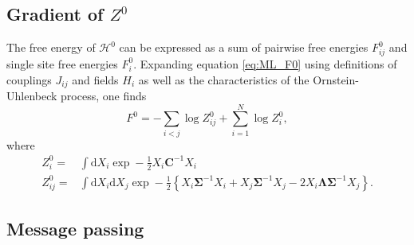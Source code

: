 \documentclass[10pt]{article}
\newcommand{\ddroit}{\textrm{d}}
\newcommand{\Lam}{\bm{\Lambda}}
\newcommand{\Sig}{\bm{\Sigma}}
\begin{document}
\subsection{Gradient of $Z^0$} %
\label{sub:gradient_of_z_0_}
The free energy of $\mathcal{H}^0$ can be expressed as a sum of pairwise free energies $F_{ij}^0$ and single site free energies $F_i^0$. Expanding equation \ref{eq:ML_F0} using definitions of couplings $J_{ij}$ and fields $H_i$ as well as the characteristics of the Ornstein-Uhlenbeck process, one finds 
\begin{equation}
  F^0 = -\sum_{i<j}\log{Z_{ij}^0} + \sum_{i=1}^N\log Z_i^0,
\end{equation}
where 
\begin{equation}
  \label{eq:ML_localZ0}
  \begin{split}
    Z_{i}^0 =& \int\ddroit X_i \exp-\frac{1}{2}X_i\bm{C}^{-1}X_i\\
    Z_{ij}^0 =& \int\ddroit X_i \ddroit X_j \exp-\frac{1}{2}\left\{ X_i\Sig^{-1}X_i + X_j\Sig^{-1}X_j - 2 X_i\Lam\Sig^{-1}X_j \right\}.
  \end{split}
\end{equation}



\subsection{Message passing} %
\label{sub:message_passing}
\end{document}

